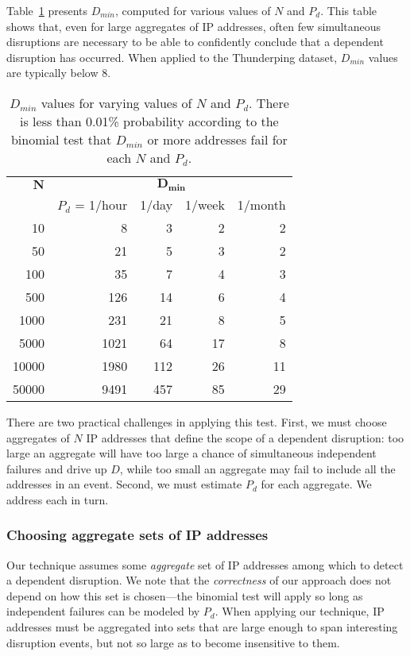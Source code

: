 Table~\ref{tbl:binomial_thresh} presents $D_{min}$, computed for
various values of $N$ and $P_d$.  This table shows that, even for
large aggregates of IP addresses, often few simultaneous disruptions
are necessary to be able to confidently conclude that a dependent
disruption has occurred. When applied to the Thunderping dataset,
$D_{min}$ values are typically below 8.

\begin{table}[th]
  \centering
  \hspace{-0.04in}
  \begin{tabular}{r|r|r|r|r}
	  $\mathbf{N}$ & \multicolumn{4}{c}{$\mathbf{D_{min}}$} \\
    & $P_d$ = 1/hour & 1/day & 1/week & 1/month \\
    \hline
10 & 8 & 3 & 2 & 2 \\
50 & 21 & 5 & 3 & 2 \\
100 & 35 & 7 & 4 & 3 \\
500 & 126 & 14 & 6 & 4 \\
1000 & 231 & 21 & 8 & 5 \\
5000 & 1021 & 64 & 17 & 8 \\
10000 & 1980 & 112 & 26 & 11 \\
50000 & 9491 & 457 & 85 & 29 \\
    \end{tabular}
  \caption{\label{tbl:binomial_thresh}
	  $D_{min}$ values for varying values of $N$ and $P_d$.  There is
	  less than 0.01\% probability according to the binomial 
	  test that $D_{min}$ or more addresses fail for each $N$ and
	  $P_d$.
  }
\end{table}


There are two practical challenges in applying this test.
First, we must choose aggregates of $N$ IP addresses that
define the scope of a dependent disruption: too large an
aggregate will have too large a chance of simultaneous independent
failures and drive up $D$, while too small an aggregate may fail to
include all the addresses in an event. 
Second, we must estimate $P_d$ for each aggregate.
We address each in turn.

\subsubsection{Choosing aggregate sets of IP addresses}

Our technique assumes some \emph{aggregate} set of IP addresses among
which to detect a dependent disruption.
%
We note that the \emph{correctness} of our approach does not depend on
how this set is chosen---the binomial test will apply so long as
independent failures can be modeled by $P_d$.
%
When applying our technique, IP
addresses must be aggregated into sets that are large enough to span interesting
disruption events, but not so large as to become insensitive to them.

